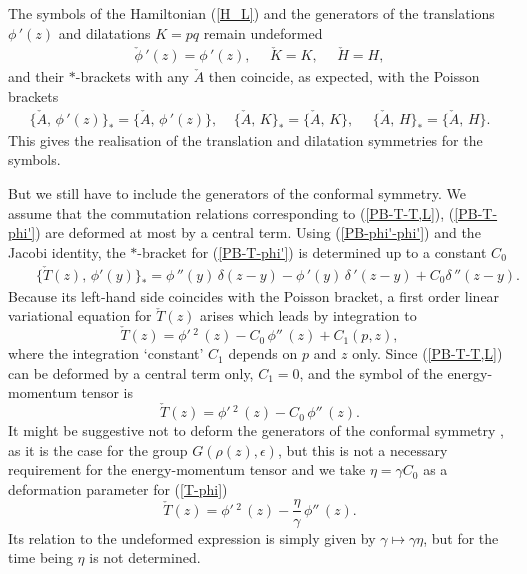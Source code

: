 \documentclass[a4paper,12pt]{article}
\begin{document}
\noindent
The symbols of the Hamiltonian (\ref{H_L}) and the generators of the
translations $\phi\,'(z)$ and dilatations $K=pq$ remain undeformed
\begin{eqnarray}\label{phi',H,K}
\check \phi\,' (z)=\phi\,' (z),~~~~~~
\check K= K,~~~~~~
\check H=H,
\end{eqnarray}
and their $*$-brackets with any $\check A$ then coincide, as expected,
with the Poisson brackets
 \begin{eqnarray}\label{*br-phi',H,K}
\{{\check A},\,\phi\,' (z)\}_*=
\{{\check A},\,\phi\,' (z)\},~~~~~
\{{\check A},\,K\}_*=
\{{\check A},\,K\},~~~~~~
\{{\check A},\,H\}_*=
\{{\check A},\,H\}.
\end{eqnarray}
This gives the realisation of the translation and
dilatation symmetries for the symbols.

\noindent
But we still  have to include the generators of the
conformal symmetry. We assume  that the commutation relations
corresponding to (\ref{PB-T-T,L}),
(\ref{PB-T-phi'}) are deformed at most by a central term.  Using
(\ref{PB-phi'-phi'}) and the Jacobi identity, the $*$-bracket for
(\ref{PB-T-phi'}) is determined up to a constant $C_0$
\begin{eqnarray}\label{*B-T-phi'}
&&\{\check{T} (z),\, \phi' (y)\}_*= \phi\,'' (y)\,\delta(z-y)-
\phi\,' (y)\,\delta\,'(z-y)+C_0\delta\,''(z-y).
\end{eqnarray}
Because its left-hand side coincides with
the Poisson bracket,  a first order
linear variational equation for $\check{T} (z)$
 arises which leads by integration to
\begin{equation}\label{checkT}
\check{T} (z)=\phi'\,^2\,(z)-C_0\,\phi''\,(z)+C_1(p,z),
\end{equation}
where the integration `constant' $C_1$ depends on $p$ and
$z$ only. Since (\ref{PB-T-T,L}) can be
deformed  by a central term only,  $C_1=0$, and  the
symbol of the energy-momentum tensor is
\begin{equation}\label{s-T-d}
   {\check T}(z) =\phi'\,^2\,(z)-C_0\,\phi''\,(z).
\end{equation}
It might be suggestive not to deform the generators of the conformal
symmetry \cite{Neveu, OW}, as it is the case for the group
$G(\rho(z),\epsilon)$, but this is not a necessary requirement for the
energy-momentum tensor \cite{Thorn, OW} and we take $\eta=\gamma
C_0$ as a deformation parameter for (\ref{T-phi})
\begin{equation}\label{s-T}
   {\check T}(z) =\phi'\,^2\,(z)-\frac{\eta}{\gamma}\,\phi''\,(z).
\end{equation}
Its relation to the undeformed expression is simply given by
$\gamma\mapsto \gamma\eta$, but for the time being $\eta$ is not
determined.
\end{document}

